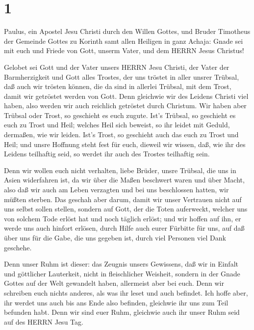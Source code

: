 \hypertarget{section}{%
\section{1}\label{section}}

 Paulus, ein Apostel Jesu Christi durch den Willen Gottes,
und Bruder Timotheus der Gemeinde Gottes zu Korinth samt allen Heiligen
in ganz Achaja:  Gnade sei mit euch und Friede von Gott,
unserm Vater, und dem HERRN Jesus Christus!

 Gelobet sei Gott und der Vater unsers HERRN Jesu Christi,
der Vater der Barmherzigkeit und Gott alles Trostes,  der
uns tröstet in aller unsrer Trübsal, daß auch wir trösten können, die da
sind in allerlei Trübsal, mit dem Trost, damit wir getröstet werden von
Gott.  Denn gleichwie wir des Leidens Christi viel haben,
also werden wir auch reichlich getröstet durch Christum. 
Wir haben aber Trübsal oder Trost, so geschieht es euch zugute. Ist's
Trübsal, so geschieht es euch zu Trost und Heil; welches Heil sich
beweist, so ihr leidet mit Geduld, dermaßen, wie wir leiden. Ist's
Trost, so geschieht auch das euch zu Trost und Heil;  und
unsre Hoffnung steht fest für euch, dieweil wir wissen, daß, wie ihr des
Leidens teilhaftig seid, so werdet ihr auch des Trostes teilhaftig sein.

 Denn wir wollen euch nicht verhalten, liebe Brüder, unsre
Trübsal, die uns in Asien widerfahren ist, da wir über die Maßen
beschwert waren und über Macht, also daß wir auch am Leben verzagten
 und bei uns beschlossen hatten, wir müßten sterben. Das
geschah aber darum, damit wir unser Vertrauen nicht auf uns selbst
sollen stellen, sondern auf Gott, der die Toten auferweckt,
 welcher uns von solchem Tode erlöst hat und noch täglich
erlöst; und wir hoffen auf ihn, er werde uns auch hinfort erlösen,
 durch Hilfe auch eurer Fürbitte für uns, auf daß über uns
für die Gabe, die uns gegeben ist, durch viel Personen viel Dank
geschehe.

 Denn unser Ruhm ist dieser: das Zeugnis unsers Gewissens,
daß wir in Einfalt und göttlicher Lauterkeit, nicht in fleischlicher
Weisheit, sondern in der Gnade Gottes auf der Welt gewandelt haben,
allermeist aber bei euch.  Denn wir schreiben euch nichts
anderes, als was ihr leset und auch befindet. Ich hoffe aber, ihr werdet
uns auch bis ans Ende also befinden, gleichwie ihr uns zum Teil befunden
habt.  Denn wir sind euer Ruhm, gleichwie auch ihr unser
Ruhm seid auf des HERRN Jesu Tag.

